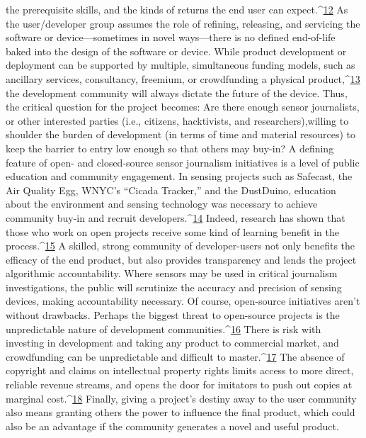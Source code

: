 the prerequisite skills, and the kinds of returns the end user can expect.^{\href{#endnotes-schroyer}{12}}
As the user/developer group assumes the role of refining, releasing, and
servicing the software or device—sometimes in novel ways—there is no
defined end-of-life baked into the design of the software or device. While
product development or deployment can be supported by multiple, simultaneous
funding models, such as ancillary services, consultancy, freemium,
or crowdfunding a physical product,^{\href{#endnotes-schroyer}{13}} the development community will
always dictate the future of the device. Thus, the critical question for the
project becomes: Are there enough sensor journalists, or other interested
parties (i.e., citizens, hacktivists, and researchers),willing to shoulder the
burden of development (in terms of time and material resources) to keep
the barrier to entry low enough so that others may buy-in?
A defining feature of open- and closed-source sensor journalism initiatives
is a level of public education and community engagement. In sensing projects
such as Safecast, the Air Quality Egg, WNYC's ``Cicada Tracker,'' and
the DustDuino, education about the environment and sensing technology was necessary to achieve community buy-in and recruit developers.^{\href{#endnotes-schroyer}{14}}
Indeed, research has shown that those who work on open projects receive
some kind of learning benefit in the process.^{\href{#endnotes-schroyer}{15}} A skilled, strong community
of developer-users not only benefits the efficacy of the end product, but also
provides transparency and lends the project algorithmic accountability.
Where sensors may be used in critical journalism investigations, the public
will scrutinize the accuracy and precision of sensing devices, making
accountability necessary.
Of course, open-source initiatives aren't without drawbacks. Perhaps
the biggest threat to open-source projects is the unpredictable nature of
development communities.^{\href{#endnotes-schroyer}{16}} There is risk with investing in development
and taking any product to commercial market, and crowdfunding can
be unpredictable and difficult to master.^{\href{#endnotes-schroyer}{17}} The absence of copyright and
claims on intellectual property rights limits access to more direct, reliable
revenue streams, and opens the door for imitators to push out copies at
marginal cost.^{\href{#endnotes-schroyer}{18}} Finally, giving a project's destiny away to the user community
also means granting others the power to influence the final product,
which could also be an advantage if the community generates a novel and
useful product.

